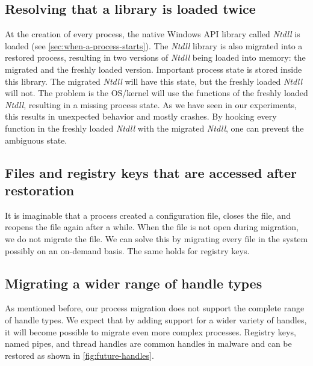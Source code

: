 \documentclass[a4paper, 11pt, english]{report}
\begin{document}
\subsection{Resolving that a library is loaded twice}
At the creation of every process, the native Windows API library called \textit{Ntdll} is loaded (see \autoref{sec:when-a-process-starts}). The \textit{Ntdll} library is also migrated into a restored process, resulting in two versions of \textit{Ntdll} being loaded into memory: the migrated and the freshly loaded version. Important process state is stored inside this library. The migrated \textit{Ntdll} will have this state, but the freshly loaded \textit{Ntdll} will not. The problem is the OS/kernel will use the functions of the freshly loaded \textit{Ntdll}, resulting in a missing process state. As we have seen in our experiments, this results in unexpected behavior and mostly crashes. By hooking every function in the freshly loaded \textit{Ntdll} with the migrated \textit{Ntdll}, one can prevent the ambiguous state.

\subsection{Files and registry keys that are accessed after restoration}
It is imaginable that a process created a configuration file, closes the file, and reopens the file again after a while. When the file is not open during migration, we do not migrate the file. We can solve this by migrating every file in the system possibly on an on-demand basis. The same holds for registry keys.


\subsection{Migrating a wider range of handle types}
As mentioned before, our process migration does not support the complete range of handle types. We expect that by adding support for a wider variety of handles, it will become possible to migrate even more complex processes. Registry keys, named pipes, and thread handles are common handles in malware and can be restored as shown in \autoref{fig:future-handles}.
\end{document}
